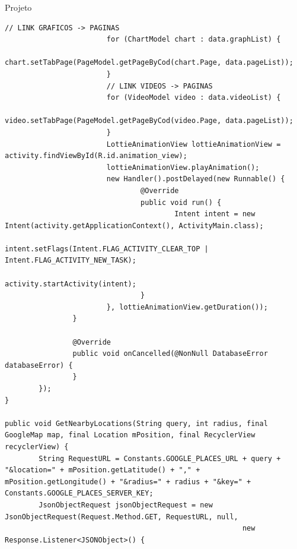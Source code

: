 \documentclass[
	12pt,				%
	openright,			%
	twoside,			%
	a4paper,			%
	english,			%
	french,				%
	spanish,			%
	brazil				%
	]{abntex2}
\begin{document}
\begin{chapter}{Projeto}
\begin{lstlisting}[numbers=none,
basicstyle=\small,
caption={DataRequestManager.java},
title={DataRequestManager.java},
label={DataRequestManager.java}]
						// LINK GRAFICOS -> PAGINAS
						for (ChartModel chart : data.graphList) {
								chart.setTabPage(PageModel.getPageByCod(chart.Page, data.pageList));
						}
						// LINK VIDEOS -> PAGINAS
						for (VideoModel video : data.videoList) {
								video.setTabPage(PageModel.getPageByCod(video.Page, data.pageList));
						}
						LottieAnimationView lottieAnimationView = activity.findViewById(R.id.animation_view);
						lottieAnimationView.playAnimation();
						new Handler().postDelayed(new Runnable() {
								@Override
								public void run() {
										Intent intent = new Intent(activity.getApplicationContext(), ActivityMain.class);
										intent.setFlags(Intent.FLAG_ACTIVITY_CLEAR_TOP | Intent.FLAG_ACTIVITY_NEW_TASK);
										activity.startActivity(intent);
								}
						}, lottieAnimationView.getDuration());
				}

				@Override
				public void onCancelled(@NonNull DatabaseError databaseError) {
				}
		});
}

public void GetNearbyLocations(String query, int radius, final GoogleMap map, final Location mPosition, final RecyclerView recyclerView) {
		String RequestURL = Constants.GOOGLE_PLACES_URL + query + "&location=" + mPosition.getLatitude() + "," + mPosition.getLongitude() + "&radius=" + radius + "&key=" + Constants.GOOGLE_PLACES_SERVER_KEY;
		JsonObjectRequest jsonObjectRequest = new JsonObjectRequest(Request.Method.GET, RequestURL, null,
														new Response.Listener<JSONObject>() {


\end{lstlisting}
\end{chapter}
\end{document}
